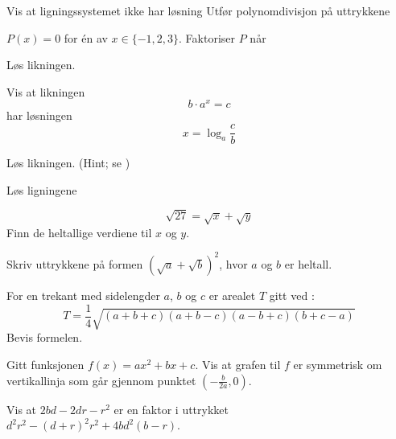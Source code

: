  \vs \vs
{}
Vis at ligningssystemet ikke har løsning
\nes
{}
Utfør polynomdivisjon på uttrykkene \os
{}

\nes

$ P(x)=0 $ for én av $ x\in\{-1, 2, 3\} $.
Faktoriser $ P $ når

\nes

Løs likningen. \os
{}

\newpage
{}
Vis at likningen 
\[ b\cdot a^x =c \]
har løsningen
\[ x=\log_a\frac{c}{b} \]

Løs likningen. (Hint; se )\os

 \os
{}

Løs ligningene


\newpage
{} \vs
\[ \sqrt{27}=\sqrt{x}+\sqrt{y} \]
Finn de heltallige verdiene til $ x $ og $ y $.

Skriv uttrykkene på formen $ \left(\sqrt{a}+\sqrt{b}\right)^2 $, hvor $ a $ og $ b $ er heltall.

For en trekant med sidelengder $ a $, $ b $ og $ c $ er arealet $ T $ gitt ved :
\[ T=\frac{1}{4}\sqrt{(a+b+c)(a+b-c)(a-b+c)(b+c-a)} \]
Bevis formelen.

Gitt funksjonen  ${f(x)=a x^2+bx +c} $. Vis at grafen til $ f $ er symmetrisk om vertikallinja som går gjennom punktet $ \left(-\frac{b}{2a}, 0\right) $.

Vis at $ 2bd-2dr-r^2 $ er en faktor i uttrykket\\ $ d^2  r^2-(d+r)^2  r^2+4b d^2 (b-r) $.
